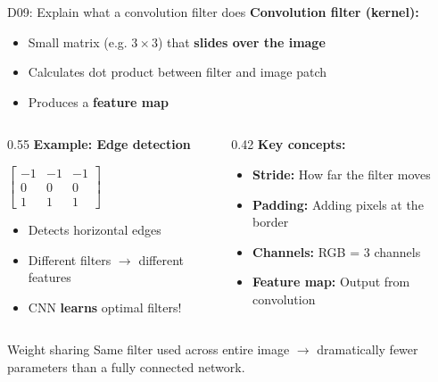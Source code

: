 \documentclass[aspectratio=169, 10pt]{beamer}
\begin{document}
\begin{frame}{D09: Explain what a convolution filter does}
    \textbf{Convolution filter (kernel):}
    \begin{itemize}
        \item Small matrix (e.g. $3 \times 3$) that \textbf{slides over the image}
        \item Calculates dot product between filter and image patch
        \item Produces a \textbf{feature map}
    \end{itemize}
    
    \vspace{0.3cm}
    \begin{columns}[T]
        \begin{column}{0.55\textwidth}
            \textbf{Example: Edge detection}
            \begin{center}
                \small
                $\begin{bmatrix} -1 & -1 & -1 \\ 0 & 0 & 0 \\ 1 & 1 & 1 \end{bmatrix}$
            \end{center}
            \begin{itemize}
                \item Detects horizontal edges
                \item Different filters $\rightarrow$ different features
                \item CNN \textbf{learns} optimal filters!
            \end{itemize}
        \end{column}
        \begin{column}{0.42\textwidth}
            \textbf{Key concepts:}
            \begin{itemize}
                \item \textbf{Stride:} How far the filter moves
                \item \textbf{Padding:} Adding pixels at the border
                \item \textbf{Channels:} RGB = 3 channels
                \item \textbf{Feature map:} Output from convolution
            \end{itemize}
        \end{column}
    \end{columns}
    
    \vspace{0.2cm}
    \begin{block}{\footnotesize Weight sharing}
        \footnotesize Same filter used across entire image $\rightarrow$ dramatically fewer parameters than a fully connected network.
    \end{block}
\end{frame}
\end{document}
